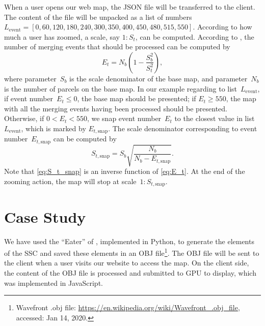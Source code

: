 \documentclass[ijgi,article,submit,moreauthors,pdftex]{Definitions/mdpi}
\begin{document}
When a user opens our web map,
the JSON file will be transferred to the client.
The content of the file will be unpacked as 
a list of numbers~$L_\mathrm{event} = 
[0, 60, 120, 180, 240, 300, 350, 400, 450, 480, 515, 550]$.
According to how much a user has zoomed,
a scale, say $1:S_t$, can be computed.
According to \citet{Huang2016Webmap},
the number of merging events that should be processed can be computed by
\begin{equation}
\label{eq:E_t}
E_t = N_b \left(1-\frac{S^2_b}{S^2_t}\right),
\end{equation}
where parameter~$S_b$ is the scale denominator of the base map,
and parameter~$N_b$ is the number of parcels on the base map.
In our example regarding to list~$L_\mathrm{event}$,
if event number~$E_t \le 0$, the base map should be presented;
if $E_t \ge 550$, the map with all the merging events having been processed
should be presented.
Otherwise, if $0<E_t < 550$, we snap event number~$E_t$ 
to the closest value in list~$L_\mathrm{event}$,
which is marked by $E_{t,\mathrm{snap}}$.
The scale denominator corresponding to event number~$E_{t,\mathrm{snap}}$
can be computed by 
\begin{equation}
\label{eq:S_t_snap}
S_{t,\mathrm{snap}} = S_b \sqrt{\frac{N_b}{N_b-E_{t,\mathrm{snap}}}}.
\end{equation}
Note that \eq\ref{eq:S_t_snap} is an inverse function of \eq\ref{eq:E_t}.
At the end of the zooming action, 
the map will stop at scale~$1:S_{t,\mathrm{snap}}$.




\section{Case Study}
\label{sec:case_study}

We have used the ``Eater'' of \citet{Suba2014Merge},
implemented in Python, 
to generate the elements of the SSC \citep{vanOosterom2014tGAPSSC} 
and saved these elements in an OBJ file\footnote{%
Wavefront .obj file:
\url{https://en.wikipedia.org/wiki/Wavefront_.obj_file},
accessed: Jan 14, 2020.}.
%
The OBJ file will be sent to the client 
when a user visits our website to access the map.
On the client side,
the content of the OBJ file is processed and submitted to GPU to display,
which was implemented in JavaScript.
\end{document}
